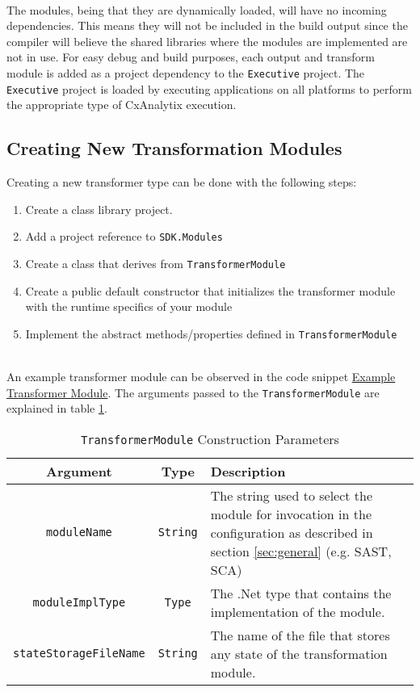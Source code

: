 \noindent\\The modules, being that they are dynamically loaded, will have no incoming dependencies.  This means they will not be included
in the build output since the compiler will believe the shared libraries where the modules are implemented are not in use.  For easy debug and build
purposes, each output and transform module is added as a project dependency to the \texttt{Executive} project.  The \texttt{Executive} project
is loaded by executing applications on all platforms to perform the appropriate type of CxAnalytix execution.


\subsection{Creating New Transformation Modules}

Creating a new transformer type can be done with the following steps:

\begin{enumerate}
    \item Create a class library project.
    \item Add a project reference to \texttt{SDK.Modules}
    \item Create a class that derives from \texttt{TransformerModule}
    \item Create a public default constructor that initializes the transformer module with the runtime specifics of your module
    \item Implement the abstract methods/properties defined in \texttt{TransformerModule}
\end{enumerate}

\noindent\\An example transformer module can be observed in the code snippet \hyperref[lst:xform]{Example Transformer Module}. The arguments passed to 
the \texttt{TransformerModule} are explained in table \ref{tab:xform}.\\


\begin{table}
    \centering
    \begin{tabular}{|c|c|l|}
        \toprule
        \textbf{Argument} & \textbf{Type} & \textbf{Description}\\
        \midrule
        \texttt{moduleName} & \texttt{String} & \makecell[l]{The string used to select the module for invocation in the\\
        configuration as described in section \ref{sec:general} (e.g. SAST, SCA)}\\
        \midrule
        \texttt{moduleImplType} & \texttt{Type} & The .Net type that contains the implementation of the module.\\
        \midrule
        \texttt{stateStorageFileName} & \texttt{String} & The name of the file that stores any state of the transformation module.\\
        \bottomrule
    \end{tabular}
    \caption{\texttt{TransformerModule} Construction Parameters}
    \label{tab:xform}
\end{table}



